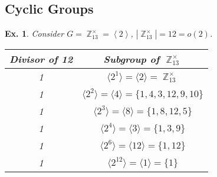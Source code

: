 \documentclass[12pt, a4paper]{book}
\DeclareMathOperator{\Z}{\mathbb{Z}}
\newtheorem{example}[theorem]{Ex.}
\theoremstyle{nonumberplain}
\begin{document}
\subsection{Cyclic Groups}
\begin{example}
    Consider $G=\Z_{13}^\times=\left\langle 2\right\rangle$, $|\Z_{13}^\times|=12=o(2)$.
    \begin{center}
        \begin{tabular}{c|c}
            Divisor of 12&Subgroup of $\Z_{13}^\times$\\
            \hline
            1& $\langle 2^1\rangle=\langle 2\rangle=\Z_{13}^\times$\\
            1& $\langle 2^2\rangle=\langle 4\rangle=\{1,4,3,12,9,10\}$\\
            1& $\langle 2^3\rangle=\langle 8\rangle=\{1,8,12,5\}$\\
            1& $\langle 2^4\rangle=\langle 3\rangle=\{1,3,9\}$\\
            1& $\langle 2^6\rangle=\langle 12\rangle=\{1,12\}$\\
            1& $\langle 2^{12}\rangle=\langle 1\rangle =\{1\}$
        \end{tabular}
    \end{center}
\end{example}
\end{document}
